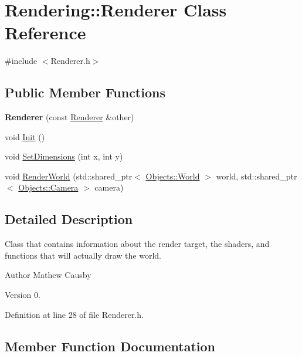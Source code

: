 \hypertarget{class_rendering_1_1_renderer}{}\section{Rendering\+:\+:Renderer Class Reference}
\label{class_rendering_1_1_renderer}


{\ttfamily \#include $<$Renderer.\+h$>$}

\subsection*{Public Member Functions}
\begin{DoxyCompactItemize}
\item 
\mbox{\label{class_rendering_1_1_renderer_a6c6c7ad697915b650db4e619ad753aae}} 
{\bfseries Renderer} (const \hyperlink{class_rendering_1_1_renderer}{Renderer} \&other)
\item 
void \hyperlink{class_rendering_1_1_renderer_a247a4d96274f8a51eccf9c771e50d82e}{Init} ()
\item 
void \hyperlink{class_rendering_1_1_renderer_ae5ef00a4de178af3ced56d36327d9c73}{Set\+Dimensions} (int x, int y)
\item 
void \hyperlink{class_rendering_1_1_renderer_aeb0226a93b50a1074a7ecacc9e25a88c}{Render\+World} (std\+::shared\+\_\+ptr$<$ \hyperlink{class_objects_1_1_world}{Objects\+::\+World} $>$ world, std\+::shared\+\_\+ptr$<$ \hyperlink{class_objects_1_1_camera}{Objects\+::\+Camera} $>$ camera)
\end{DoxyCompactItemize}


\subsection{Detailed Description}
Class that contains information about the render target, the shaders, and functions that will actually draw the world. \begin{DoxyAuthor}{Author}
Mathew Causby 
\end{DoxyAuthor}
\begin{DoxyVersion}{Version}
0. 
\end{DoxyVersion}


Definition at line 28 of file Renderer.\+h.



\subsection{Member Function Documentation}
\mbox{\label{class_rendering_1_1_renderer_a247a4d96274f8a51eccf9c771e50d82e}} 
